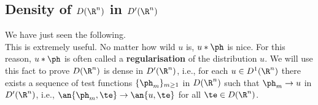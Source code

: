 \subsection{Density of $D(\R^n)$ in $D'(\R^n)$}
We have just seen the following.\\

\vskip0.15in
This is extremely useful. No matter how wild $u$ is, $u*\ph$ is nice. For this reason, $u*\ph$ is often called a  \textbf{regularisation} of the distribution $u$.
We will use this fact to prove $D(\R^n)$ is dense in $D'(\R^n)$, i.e., for each $u\in D^1(\R^n)$ there exists a sequence of test functions $\{\ph_m\}_{m\ge 1}$ in $D(\R^n)$ such that $\ph_m\to u$ in $D'(\R^n)$, i.e., $\an{\ph_m,\te}\to \an{u,\te}$ for all $\te\in D(\R^n)$.



